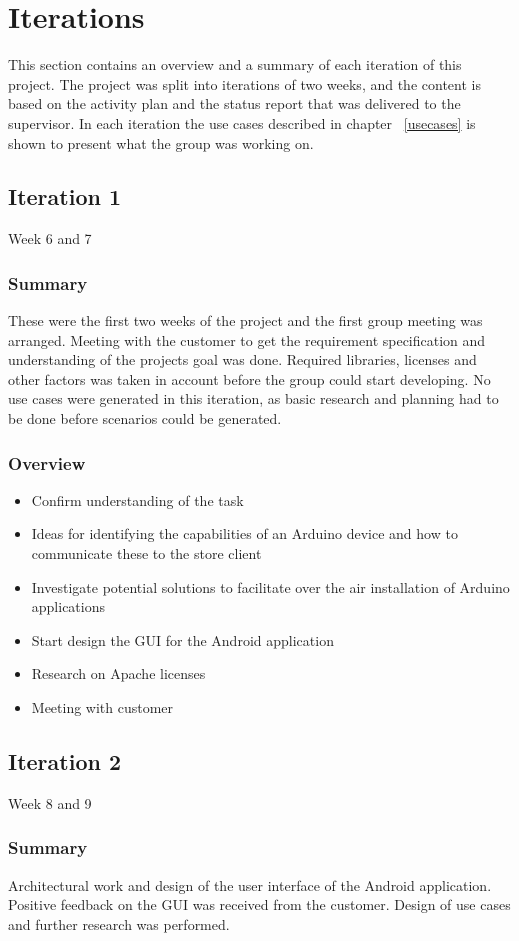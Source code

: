 \chapter{Iterations}

This section contains an overview and a summary of each iteration of this project. The project was split into
iterations of two weeks, and the content is based on the activity plan and the status report that was delivered to the supervisor. In each iteration the use cases described in chapter ~\ref{usecases} is shown to present what the group was working on.

\section{Iteration 1}
Week 6 and 7
\subsection{Summary}
	These were the first two weeks of the project and the first group meeting was arranged.	Meeting with the customer to get the requirement specification and understanding of the projects goal was done.	Required libraries, licenses and other factors was taken in account before the group could start developing. No use cases were generated in this iteration, as basic research and planning had to be done before scenarios could be generated.
\subsection{Overview}
\begin{itemize}
	\item{Confirm understanding of the task}
	\item{Ideas for identifying the capabilities of an Arduino device and how to communicate these to the store client}
	\item{Investigate potential solutions to facilitate over the air installation of Arduino applications}
	\item{Start design the GUI for the Android application}
	\item{Research on Apache licenses}
	\item{Meeting with customer}
\end{itemize}

\section{Iteration 2}
Week 8 and 9
\subsection{Summary}
	Architectural work and design of the user interface of the Android application. Positive feedback on the GUI was received from the customer. Design of use cases and further research was performed.
